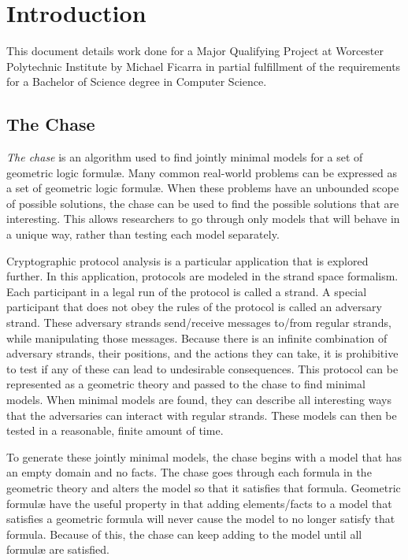 \section{Introduction}

	This document details work done for a Major Qualifying Project at Worcester
	Polytechnic Institute by Michael Ficarra in partial fulfillment of the
	requirements for a Bachelor of Science degree in Computer Science.

	\subsection{The Chase}

		\emph{The chase} is an algorithm used to find jointly minimal models
		for a set of geometric logic formul{\ae}. Many common real-world
		problems can be expressed as a set of geometric logic formul{\ae}. When
		these problems have an unbounded scope of possible solutions, the chase
		can be used to find the possible solutions that are interesting. This
		allows researchers to go through only models that will behave in a
		unique way, rather than testing each model separately.

		Cryptographic protocol analysis is a particular application that is
		explored further. In this application, protocols are modeled in the
		strand space formalism. Each participant in a legal run of the
		protocol is called a strand. A special participant that does not obey
		the rules of the protocol is called an adversary strand. These
		adversary strands send/receive messages to/from regular strands, while
		manipulating those messages. Because there is an infinite combination
		of adversary strands, their positions, and the actions they can take,
		it is prohibitive to test if any of these can lead to undesirable
		consequences. This protocol can be represented as a geometric theory
		and passed to the chase to find minimal models. When minimal models
		are found, they can describe all interesting ways that the adversaries
		can interact with regular strands. These models can then be tested in
		a reasonable, finite amount of time.

		To generate these jointly minimal models, the chase begins with a model
		that has an empty domain and no facts. The chase goes through each
		formula in the geometric theory and alters the model so that it
		satisfies that formula. Geometric formul{\ae} have the useful property
		in that adding elements/facts to a model that satisfies a geometric
		formula will never cause the model to no longer satisfy that formula.
		Because of this, the chase can keep adding to the model until all
		formul{\ae} are satisfied.

